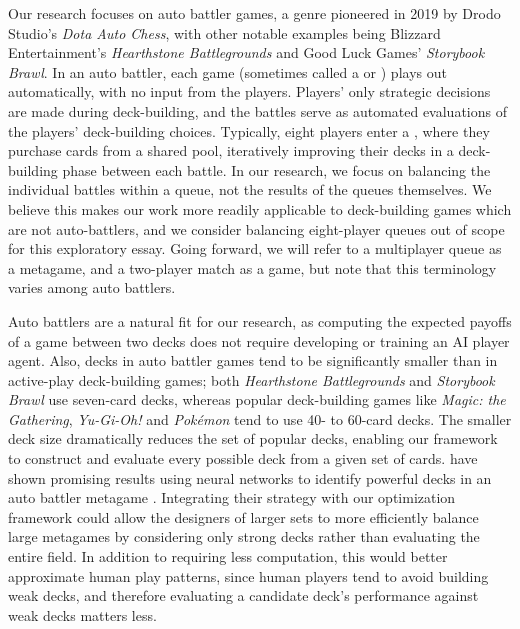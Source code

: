 Our research focuses on auto battler games, a genre pioneered in 2019
by Drodo Studio's \textit{Dota Auto Chess}, with other notable
examples being Blizzard Entertainment's \textit{Hearthstone
  Battlegrounds} and Good Luck Games' \textit{Storybook Brawl}.
In an auto battler, each game (sometimes called a  or
) plays out automatically, with no input from the
players. Players' only strategic decisions are made during
deck-building, and the battles serve as automated evaluations of the
players' deck-building choices. Typically, eight players enter a
, where they purchase cards from a shared pool,
iteratively improving their decks in a deck-building phase between
each battle. In our research, we focus on balancing the individual
battles within a queue, not the results of the queues themselves. We
believe this makes our work more readily applicable to deck-building
games which are not auto-battlers, and we consider balancing
eight-player queues out of scope for this exploratory essay.  Going
forward, we will refer to a multiplayer queue as a metagame, and a
two-player match as a game, but note that this terminology varies
among auto battlers.

Auto battlers are a natural fit for our research, as computing the
expected payoffs of a game between two decks does not require
developing or training an AI player agent. Also, decks in auto battler
games tend to be significantly smaller than in active-play
deck-building games; both \textit{Hearthstone Battlegrounds} and
\textit{Storybook Brawl} use seven-card decks, whereas popular
deck-building games like \textit{Magic: the Gathering},
\textit{Yu-Gi-Oh!} and \textit{Pok\'{e}mon} tend to use 40- to 60-card
decks.
The smaller deck size dramatically reduces the set of popular decks,
enabling our framework to construct and evaluate every possible deck
from a given set of cards. \citeauthor{xumining} have shown promising
results using neural networks to identify powerful decks in an auto
battler metagame \cite{xumining}. Integrating their strategy with our
optimization framework could allow the designers of larger sets to
more efficiently balance large metagames by considering only strong
decks rather than evaluating the entire field. In addition to
requiring less computation, this would better approximate human play
patterns, since human players tend to avoid building weak decks, and
therefore evaluating a candidate deck's performance against weak decks
matters less.
